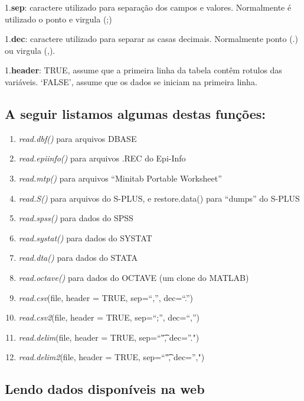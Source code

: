\documentclass[
]{book}
\providecommand{\tightlist}{%
  \setlength{\itemsep}{0pt}\setlength{\parskip}{0pt}}
\begin{document}
1.\textbf{sep}: caractere utilizado para separação dos campos e valores. Normalmente é utilizado o ponto e virgula (;)

1.\textbf{dec}: caractere utilizado para separar as casas decimais. Normalmente ponto (.) ou virgula (,).

1.\textbf{header}: TRUE, assume que a primeira linha da tabela contêm rotulos das variáveis. `FALSE', assume que os dados se iniciam na primeira linha.

\hypertarget{a-seguir-listamos-algumas-destas-funuxe7uxf5es}{%
\subsection{A seguir listamos algumas destas funções:}\label{a-seguir-listamos-algumas-destas-funuxe7uxf5es}}

\begin{enumerate}
\def\labelenumi{\arabic{enumi}.}
\tightlist
\item
  \emph{read.dbf()} para arquivos DBASE
\item
  \emph{read.epiinfo()} para arquivos .REC do Epi-Info
\item
  \emph{read.mtp()} para arquivos ``Minitab Portable Worksheet''
\item
  \emph{read.S()} para arquivos do S-PLUS, e restore.data() para ``dumps'' do S-PLUS
\item
  \emph{read.spss()} para dados do SPSS
\item
  \emph{read.systat()} para dados do SYSTAT
\item
  \emph{read.dta()} para dados do STATA
\item
  \emph{read.octave()} para dados do OCTAVE (um clone do MATLAB)
\item
  \emph{read.csv}(file, header = TRUE, sep=``,'', dec=``.'')
\item
  \emph{read.csv2}(file, header = TRUE, sep=``;'', dec=``,'')
\item
  \emph{read.delim}(file, header = TRUE, sep=``\t", dec=''.")
\item
  \emph{read.delim2}(file, header = TRUE, sep=``\t", dec='',")
\end{enumerate}

\hypertarget{lendo-dados-disponuxedveis-na-web}{%
\subsection{Lendo dados disponíveis na web}\label{lendo-dados-disponuxedveis-na-web}}
\end{document}
